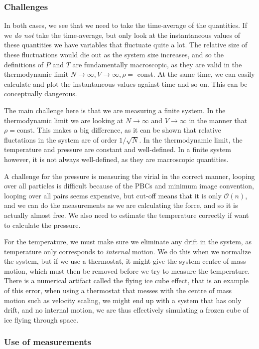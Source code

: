 \documentclass[a4paper, 11pt, notitlepage, english]{article}
\begin{document}
\subsubsection*{Challenges}

In both cases, we see that we need to take the time-average of the quantities. If we \emph{do not} take the time-average, but only look at the instantaneous values of these quantities we have variables that fluctuate quite a lot. The relative size of these fluctuations would die out as the system size increases, and so the definitions of $P$ and $T$ are fundamentally macroscopic, as they are valid in the thermodynamic limit $N\to\infty, V\to \infty, \rho=$ const. At the same time, we can easily calculate and plot the instantaneous values against time and so on. This can be conceptually dangerous.

The main challenge here is that we are measuring a finite system. In the thermodynamic limit we are looking at $N\to \infty$ and $V\to \infty$ in the manner that $\rho = \mbox{const}$. This makes a big difference, as it can be shown that relative fluctations in the system are of order $1/\sqrt{N}$. In the thermodynamic limit, the temperature and pressure are constant and well-defined. In a finite system however, it is not always well-defined, as they are macroscopic quantities.

A challenge for the pressure is measuring the virial in the correct manner, looping over all particles is difficult because of the PBCs and minimum image convention, looping over all pairs seems expensive, but cut-off means that it is only $\mathcal{O}(n)$, and we can do the measurements as we are calculating the force, and so it is actually almost free. We also need to estimate the temperature correctly if want to calculate the pressure.

For the temperature, we must make sure we eliminate any drift in the system, as temperature only corresponds to \emph{internal} motion. We do this when we normalize the system, but if we use a thermostat, it might give the system centre of mass motion, which must then be removed before we try to measure the temperature. There is a numerical artifact called the flying ice cube effect, that is an example of this error, when using a thermostat that messes with the centre of mass motion such as velocity scaling, we might end up with a system that has only drift, and no internal motion, we are thus effectively simulating a frozen cube of ice flying through space.

\subsubsection*{Use of measurements}
\end{document}

